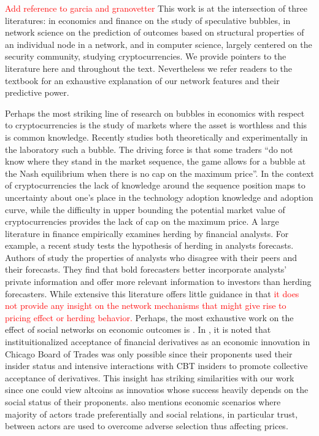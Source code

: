 \textcolor{red}{Add reference to garcia and granovetter}
This work is at the intersection of three literatures: in economics and finance on the study of speculative bubbles, in network science on the prediction of outcomes based on structural properties of an individual node in a network, and in computer science, largely centered on the security community, studying cryptocurrencies.
We provide pointers to the literature here and throughout the text. Nevertheless we refer readers to the textbook \cite{KleinbergNetworks} for an exhaustive explanation of our network features and their predictive power.

Perhaps the most striking line of research on bubbles in economics with respect to cryptocurrencies is the study of markets where the asset is worthless and this is common knowledge. 
Recently \cite{moinas2013bubble} studies both theoretically and experimentally in the laboratory such a bubble. 
The driving force is that some traders ``do not know where they stand in the market sequence, the game allows for
a bubble at the Nash equilibrium when there is no cap on the maximum price''.
In the context of cryptocurrencies the lack of knowledge around the sequence position maps to uncertainty about one's place in the technology adoption knowledge and adoption curve, while the difficulty in upper bounding the potential market value of cryptocurrencies provides the lack of cap on the maximum price. 
A large literature in finance empirically examines herding by financial analysts. For example, a recent study \cite{jegadeesh2009analysts} tests the hypothesis of herding in analysts forecasts. 
Authors of \cite{clement2005financial} study the properties of analysts who disagree with their peers and their forecasts. They find that bold forecasters better incorporate analysts' private information and offer more relevant information to investors than herding forecasters.
While extensive this literature offers little guidance in that \textcolor{red}{it does not provide any insight on the network mechanisms that might give rise to pricing effect or herding behavior.} Perhaps, the most exhaustive work on the effect of social networks on economic outcomes is \cite{Granovetter-outcomes}. In \cite{Granovetter-outcomes}, it is noted that instituitionalized acceptance of financial derivatives as an economic innovation in Chicago Board of Trades was only possible since their proponents used their insider status and intensive interactions with CBT insiders to promote collective acceptance of derivatives. This insight has striking similarities with our work since one could view altcoins as innovatios whose success heavily depends on the social status of their proponents. \cite{Granovetter-outcomes} also mentions economic scenarios where majority of actors trade preferentially and social relations, in particular trust, between actors are used to overcome adverse selection thus affecting prices.


